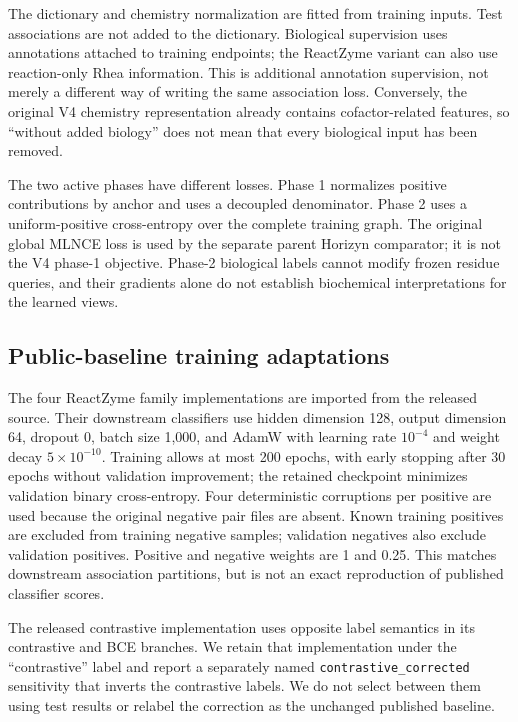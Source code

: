 The dictionary and chemistry normalization are fitted from training inputs.
Test associations are not added to the dictionary. Biological supervision
uses annotations attached to training endpoints; the ReactZyme variant can
also use reaction-only Rhea information. This is additional annotation
supervision, not merely a different way of writing the same association loss.
Conversely, the original V4 chemistry representation already contains
cofactor-related features, so ``without added biology'' does not mean that
every biological input has been removed.

The two active phases have different losses. Phase 1 normalizes positive
contributions by anchor and uses a decoupled denominator. Phase 2 uses a
uniform-positive cross-entropy over the complete training graph. The
original global MLNCE loss is used by the separate parent Horizyn comparator;
it is not the V4 phase-1 objective. Phase-2 biological labels cannot modify
frozen residue queries, and their gradients alone do not establish
biochemical interpretations for the learned views.

\subsection{Public-baseline training adaptations}

The four ReactZyme family implementations are imported from the released
source. Their downstream classifiers use hidden dimension 128, output
dimension 64, dropout 0, batch size 1,000, and AdamW with learning rate
$10^{-4}$ and weight decay $5\times10^{-10}$. Training allows at most 200
epochs, with early stopping after 30 epochs without validation improvement;
the retained checkpoint minimizes validation binary cross-entropy. Four
deterministic corruptions per positive are used because the original negative
pair files are absent. Known training positives are excluded from training
negative samples; validation negatives also exclude validation positives.
Positive and negative weights are 1 and 0.25. This matches downstream
association partitions, but is not an exact reproduction of published
classifier scores.

The released contrastive implementation uses opposite label semantics in
its contrastive and BCE branches. We retain that implementation under the
``contrastive'' label and report a separately named
\texttt{contrastive\_corrected} sensitivity that inverts the contrastive
labels. We do not select between them using test results or relabel the
correction as the unchanged published baseline.

